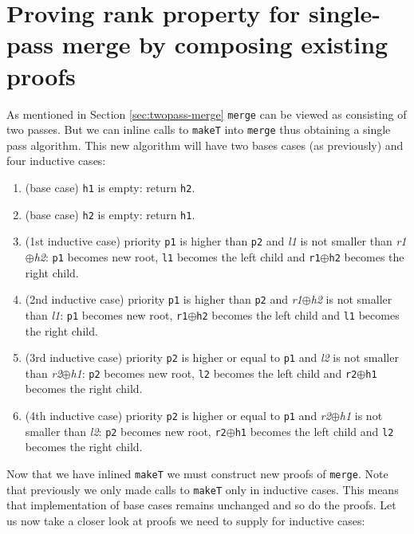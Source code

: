 \section[Proving rank property for single-pass merge by composing existing proofs]{Proving rank property for single-pass merge by composing existing proofs} \label{sec:single-pass-merge-proof-by-comp}

As mentioned in Section \ref{sec:twopass-merge} \texttt{merge} can be viewed as consisting of two passes. But we can inline calls to \texttt{makeT} into \texttt{merge} thus obtaining a single pass algorithm. This new algorithm will have two bases cases (as previously) and four inductive cases:

\begin{enumerate}
 \item (base case) \texttt{h1} is empty: return \texttt{h2}.
 \item (base case) \texttt{h2} is empty: return \texttt{h1}.
 \item (1st inductive case) priority \texttt{p1} is higher than \texttt{p2} and \textit{l1} is not smaller than  \textit{r1}$\oplus$\textit{h2}: \texttt{p1} becomes new root, \texttt{l1} becomes the left child and \texttt{r1}$\oplus$\texttt{h2} becomes the right child.
 \item (2nd inductive case) priority \texttt{p1} is higher than \texttt{p2} and \textit{r1}$\oplus$\textit{h2} is not smaller than \textit{l1}: \texttt{p1} becomes new root, \texttt{r1}$\oplus$\texttt{h2} becomes the left child and \texttt{l1} becomes the right child.
 \item (3rd inductive case) priority \texttt{p2} is higher or equal to \texttt{p1} and \textit{l2} is not smaller than  \textit{r2}$\oplus$\textit{h1}: \texttt{p2} becomes new root, \texttt{l2} becomes the left child and \texttt{r2}$\oplus$\texttt{h1} becomes the right child.
 \item (4th inductive case) priority \texttt{p2} is higher or equal to \texttt{p1} and \textit{r2}$\oplus$\textit{h1} is not smaller than  \textit{l2}: \texttt{p2} becomes new root, \texttt{r2}$\oplus$\texttt{h1} becomes the left child and \texttt{l2} becomes the right child.
\end{enumerate}
\noindent
Now that we have inlined \texttt{makeT} we must construct new proofs of \texttt{merge}. Note that previously we only made calls to \texttt{makeT} only in inductive cases. This means that implementation of base cases remains unchanged and so do the proofs. Let us now take a closer look at proofs we need to supply for inductive cases:

